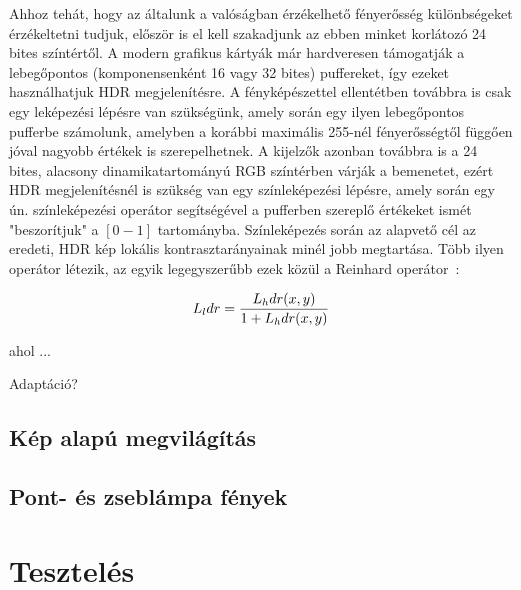 \documentclass[12pt,oneside]{book}
\begin{document}
Ahhoz tehát, hogy az általunk a valóságban érzékelhető fényerősség különbségeket érzékeltetni tudjuk, először is el kell szakadjunk az ebben minket korlátozó 24 bites színtértől. A modern grafikus kártyák már hardveresen támogatják a lebegőpontos (komponensenként 16 vagy 32 bites) puffereket, így ezeket használhatjuk HDR megjelenítésre. A fényképészettel ellentétben továbbra is csak egy leképezési lépésre van szükségünk, amely során egy ilyen lebegőpontos pufferbe számolunk, amelyben a korábbi maximális 255-nél fényerősségtől függően jóval nagyobb értékek is szerepelhetnek. A kijelzők azonban továbbra is a 24 bites, alacsony dinamikatartományú RGB színtérben várják a bemenetet, ezért HDR megjelenítésnél is szükség van egy színleképezési lépésre, amely során egy ún. színleképezési operátor segítségével a pufferben szereplő értékeket ismét "beszorítjuk" a \([0-1]\) tartományba. Színleképezés során az alapvető cél az eredeti, HDR kép lokális kontrasztarányainak minél jobb megtartása. Több ilyen operátor létezik, az egyik legegyszerűbb ezek közül a Reinhard operátor~\cite{reinhard2002photographic}:

\[
L_ldr = { L_hdr(x, y) \over 1 + L_hdr(x, y) }
\]

ahol ...

Adaptáció?

\subsection{Kép alapú megvilágítás}
\subsection{Pont- és zseblámpa fények}

\section{Tesztelés}

{}

\end{document}
